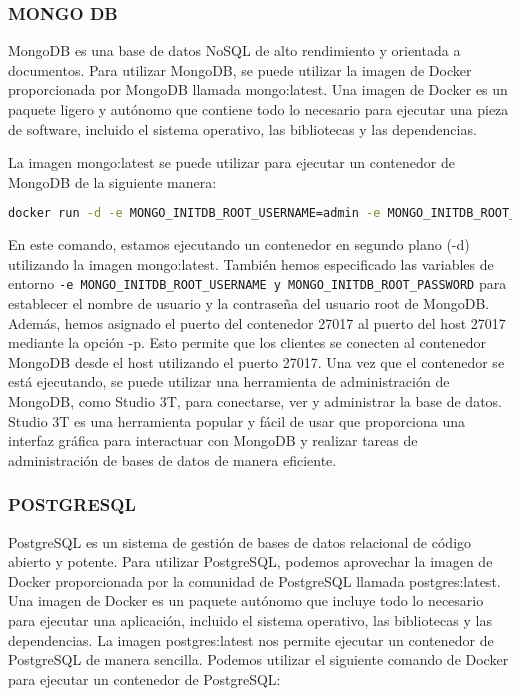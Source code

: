 \documentclass{article}
\begin{document}
\subsubsection*{MONGO DB}

MongoDB es una base de datos NoSQL de alto rendimiento y orientada a documentos. Para utilizar MongoDB, se puede utilizar la imagen de Docker proporcionada por MongoDB llamada mongo:latest. Una imagen de Docker es un paquete ligero y autónomo que contiene todo lo necesario para ejecutar una pieza de software, incluido el sistema operativo, las bibliotecas y las dependencias.

La imagen mongo:latest se puede utilizar para ejecutar un contenedor de MongoDB de la siguiente manera:

\begin{lstlisting}[language=bash]
docker run -d -e MONGO_INITDB_ROOT_USERNAME=admin -e MONGO_INITDB_ROOT_PASSWORD=@udemy123 -p 27017:27017 mongo:latest
\end{lstlisting}

En este comando, estamos ejecutando un contenedor en segundo plano (-d) utilizando la imagen mongo:latest. También hemos especificado las variables de entorno \lstinline{-e MONGO_INITDB_ROOT_USERNAME y MONGO_INITDB_ROOT_PASSWORD} para establecer el nombre de usuario y la contraseña del usuario root de MongoDB. Además, hemos asignado el puerto del contenedor 27017 al puerto del host 27017 mediante la opción -p. Esto permite que los clientes se conecten al contenedor MongoDB desde el host utilizando el puerto 27017. Una vez que el contenedor se está ejecutando, se puede utilizar una herramienta de administración de MongoDB, como Studio 3T, para conectarse, ver y administrar la base de datos. Studio 3T es una herramienta popular y fácil de usar que proporciona una interfaz gráfica para interactuar con MongoDB y realizar tareas de administración de bases de datos de manera eficiente.

\subsubsection*{POSTGRESQL}
PostgreSQL es un sistema de gestión de bases de datos relacional de código abierto y potente. Para utilizar PostgreSQL, podemos aprovechar la imagen de Docker proporcionada por la comunidad de PostgreSQL llamada postgres:latest. Una imagen de Docker es un paquete autónomo que incluye todo lo necesario para ejecutar una aplicación, incluido el sistema operativo, las bibliotecas y las dependencias. La imagen postgres:latest nos permite ejecutar un contenedor de PostgreSQL de manera sencilla. Podemos utilizar el siguiente comando de Docker para ejecutar un contenedor de PostgreSQL:
\end{document}

